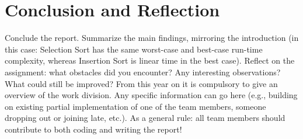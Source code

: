 \documentclass[a4paper,10pt,oneside]{article}
\begin{document}
\section{Conclusion and Reflection}

Conclude the report. Summarize the main findings, mirroring the introduction (in this case:
Selection Sort has the same worst-case and best-case run-time complexity, whereas Insertion
Sort is linear time in the best case). Reflect on the assignment: what obstacles did you
encounter? Any interesting observations? What could still be improved?
From this year on it is compulsory to give an overview of the work division. Any specific
information can go here (e.g., building on existing partial implementation of one of the team
members, someone dropping out or joining late, etc.). As a general rule: all team members
should contribute to both coding and writing the report!
\end{document}
